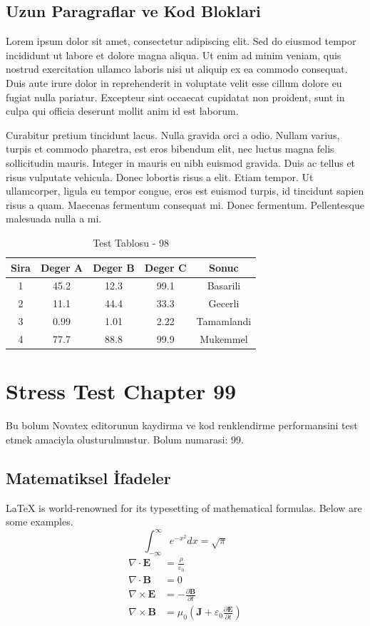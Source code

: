 \documentclass[12pt,a4paper]{article}
\begin{document}
\subsection{Uzun Paragraflar ve Kod Bloklari}
Lorem ipsum dolor sit amet, consectetur adipiscing elit. Sed do eiusmod tempor incididunt ut labore et dolore magna aliqua. Ut enim ad minim veniam, quis nostrud exercitation ullamco laboris nisi ut aliquip ex ea commodo consequat. Duis aute irure dolor in reprehenderit in voluptate velit esse cillum dolore eu fugiat nulla pariatur. Excepteur sint occaecat cupidatat non proident, sunt in culpa qui officia deserunt mollit anim id est laborum.

Curabitur pretium tincidunt lacus. Nulla gravida orci a odio. Nullam varius, turpis et commodo pharetra, est eros bibendum elit, nec luctus magna felis sollicitudin mauris. Integer in mauris eu nibh euismod gravida. Duis ac tellus et risus vulputate vehicula. Donec lobortis risus a elit. Etiam tempor. Ut ullamcorper, ligula eu tempor congue, eros est euismod turpis, id tincidunt sapien risus a quam. Maecenas fermentum consequat mi. Donec fermentum. Pellentesque malesuada nulla a mi.

\begin{table}[h!]
\centering
\begin{tabular}{|c|c|c|c|c|}
\hline
\textbf{Sira} & \textbf{Deger A} & \textbf{Deger B} & \textbf{Deger C} & \textbf{Sonuc} \\
\hline
1 & 45.2 & 12.3 & 99.1 & Basarili \\
2 & 11.1 & 44.4 & 33.3 & Gecerli \\
3 & 0.99 & 1.01 & 2.22 & Tamamlandi \\
4 & 77.7 & 88.8 & 99.9 & Mukemmel \\
\hline
\end{tabular}
\caption{Test Tablosu - 98}
\end{table}

\newpage
\section{Stress Test Chapter 99}
Bu bolum Novatex editorunun kaydirma ve kod renklendirme performansini test etmek amaciyla olusturulmustur. Bolum numarasi: 99.

\subsection{Matematiksel İfadeler}
\LaTeX{} is world-renowned for its typesetting of mathematical formulas. Below are some examples.
\begin{equation}
\int_{-\infty}^{\infty} e^{-x^2} dx = \sqrt{\pi}
\end{equation}
\begin{align}
\nabla \cdot \mathbf{E} &= \frac{\rho}{\varepsilon_0} \\
\nabla \cdot \mathbf{B} &= 0 \\
\nabla \times \mathbf{E} &= -\frac{\partial \mathbf{B}}{\partial t} \\
\nabla \times \mathbf{B} &= \mu_0\left(\mathbf{J} + \varepsilon_0 \frac{\partial \mathbf{E}}{\partial t}\right)
\end{align}
\end{document}
